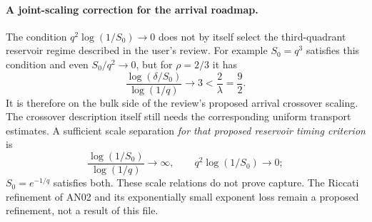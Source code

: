 \documentclass[11pt]{article}
\numberwithin{equation}{section}
\theoremstyle{remark}\newtheorem{remark}[theorem]{Remark}
\newcommand{\1}{\mathbf 1}
\begin{document}
\paragraph{A joint-scaling correction for the arrival roadmap.}
The condition $q^2\log(1/S_0)\to0$ does not by itself select the
third-quadrant reservoir regime described in the user's review.
For example $S_0=q^3$ satisfies this condition and even $S_0/q^2\to0$,
but for $\rho=2/3$ it has
\[
 \frac{\log(\delta/S_0)}{\log(1/q)}\longrightarrow3<\frac2\lambda=\frac92.
\]
It is therefore on the bulk side of the review's proposed arrival
crossover scaling. The crossover description itself still needs the
corresponding uniform transport estimates. A sufficient scale separation
\emph{for that proposed reservoir timing criterion} is
\[
 \frac{\log(1/S_0)}{\log(1/q)}\to\infty,\qquad
 q^2\log(1/S_0)\to0;
\]
$S_0=e^{-1/q}$ satisfies both. These scale relations do not prove capture.
The Riccati refinement of AN02 and its exponentially small exponent loss
remain a proposed refinement, not a result of this file.
\end{document}
